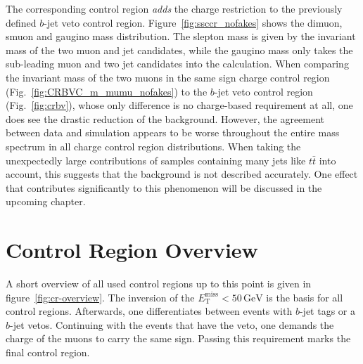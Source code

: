 The corresponding control region \textit{adds} the charge restriction to the previously defined $b$-jet veto control region. Figure~\ref{fig:ssccr_nofakes} shows the dimuon, smuon and gaugino mass distribution. The slepton mass is given by the invariant mass of the two muon and jet candidates, while the gaugino mass only takes the sub-leading muon and two jet candidates into the calculation. When comparing the invariant mass of the two muons in the same sign charge control region (Fig.~\ref{fig:CRBVC_m_mumu_nofakes}) to the $b$-jet veto control region (Fig.~\ref{fig:crbv}), whose only difference is no charge-based requirement at all, one does see the drastic reduction of the background. However, the agreement between data and simulation appears to be worse throughout the entire mass spectrum in all charge control region distributions. When taking the unexpectedly large contributions of samples containing many jets like $t\bar{t}$ into account, this suggests that the background is not described accurately. One effect that contributes significantly to this phenomenon will be discussed in the upcoming chapter.

\section{Control Region Overview}
\label{sec:cr-overview}

A short overview of all used control regions up to this point is given in figure~\ref{fig:cr-overview}. The inversion of the $E^{\text{miss}}_{\text{T}} < 50\,\text{GeV}$ is the basis for all control regions. Afterwards, one differentiates between events with $b$-jet tags or a $b$-jet vetos. Continuing with the events that have the veto, one demands the charge of the muons to carry the same sign. Passing this requirement marks the final control region.

